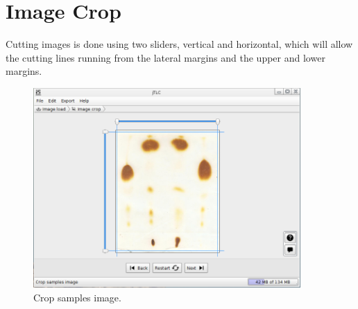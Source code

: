 \section{Image Crop}
Cutting images is done using two sliders, vertical and horizontal, which will allow the cutting lines running from the lateral margins and the upper and lower margins.
\begin{figure}[H]
	\vspace{0cm}
	\centering
	\includegraphics[width=385px]{imagenes/crop}
	\centering
	\vspace{-0.4cm}
	\caption{Crop samples image.}
	\label{fig:image_cut}
	\vspace{-0.25cm}
\end{figure}

